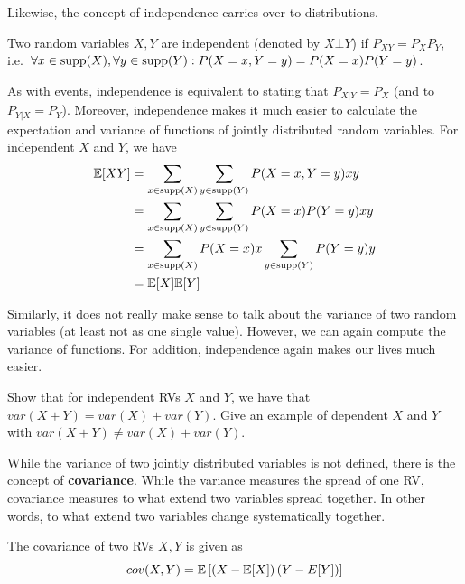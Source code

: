 Likewise, the concept of independence carries over to distributions.

\begin{Definition}
Two random variables $ X,Y $ are independent (denoted by $ X \bot Y $)
if $P_{XY} = P_X P_Y$, i.e.\ $\forall x \in \operatorname{supp}(X), \forall y \in \operatorname{supp}(Y): P(X=x, Y=y) = P(X=x)P(Y=y) $.
\end{Definition}

As with events, independence is equivalent to stating that $ P_{X|Y} = P_{X} $ (and
to $P_{Y|X}=P_Y$). Moreover, independence makes it much easier to calculate the expectation and variance of functions of jointly distributed random variables.
For independent $X$ and $Y$, we have
\begin{align}
\mathbb{E}[XY] &= \sum_{x \in \operatorname{supp}(X)} \sum_{y \in \operatorname{supp}(Y)} P(X=x,Y=y) x y \\
&= \sum_{x \in \operatorname{supp}(X)} \sum_{y \in \operatorname{supp}(Y)} P(X=x)P(Y=y) x y \\
&= \sum_{x \in \operatorname{supp}(X)} P(X=x)x \sum_{y \in \operatorname{supp}(Y)}  P(Y=y) y \\
&= \mathbb{E}[X]\mathbb{E}[Y]
\end{align}

Similarly, it does not really make sense to talk about the variance of two random variables (at least not as one single
value). However, we can again compute the variance of functions. For addition, independence again makes our lives
much easier.

\begin{Exercise}
Show that for independent RVs $X$ and $Y$, we have that $ var(X + Y) =
var(X) + var(Y) $. Give an example of dependent $X$ and $Y$ with $ var(X + Y) \neq
var(X) + var(Y) $.
\end{Exercise}

While the variance of two jointly distributed variables is not defined, there is the concept of \textbf{covariance}. While the variance measures the spread
of one RV, covariance measures to what extend two variables spread together. In other words, to what extend two variables change systematically together.
\begin{Definition}[Covariance]
The covariance of two RVs $ X,Y $ is given as
$$ cov(X,Y) = \mathbb{E}\left[\left(X - \mathbb{E}[X]\right)\left(Y - E[Y]\right)\right] $$
\end{Definition}


